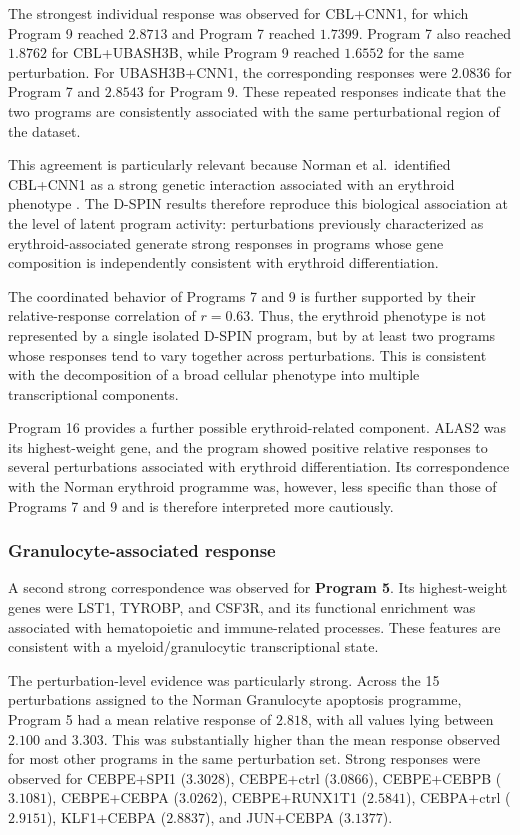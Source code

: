 \documentclass[11pt,a4paper]{article}
\begin{document}
The strongest individual response was observed for CBL+CNN1, for which Program 9 reached $2.8713$ and Program 7 reached $1.7399$. Program 7 also reached $1.8762$ for CBL+UBASH3B, while Program 9 reached $1.6552$ for the same perturbation. For UBASH3B+CNN1, the corresponding responses were $2.0836$ for Program 7 and $2.8543$ for Program 9. These repeated responses indicate that the two programs are consistently associated with the same perturbational region of the dataset.

This agreement is particularly relevant because Norman et al.~identified CBL+CNN1 as a strong genetic interaction associated with an erythroid phenotype \citep{Norman2019}. The D-SPIN results therefore reproduce this biological association at the level of latent program activity: perturbations previously characterized as erythroid-associated generate strong responses in programs whose gene composition is independently consistent with erythroid differentiation.

The coordinated behavior of Programs 7 and 9 is further supported by their relative-response correlation of $r=0.63$. Thus, the erythroid phenotype is not represented by a single isolated D-SPIN program, but by at least two programs whose responses tend to vary together across perturbations. This is consistent with the decomposition of a broad cellular phenotype into multiple transcriptional components.

Program 16 provides a further possible erythroid-related component. ALAS2 was its highest-weight gene, and the program showed positive relative responses to several perturbations associated with erythroid differentiation. Its correspondence with the Norman erythroid programme was, however, less specific than those of Programs 7 and 9 and is therefore interpreted more cautiously.

\subsubsection{Granulocyte-associated response}

A second strong correspondence was observed for \textbf{Program 5}. Its highest-weight genes were LST1, TYROBP, and CSF3R, and its functional enrichment was associated with hematopoietic and immune-related processes. These features are consistent with a myeloid/granulocytic transcriptional state.

The perturbation-level evidence was particularly strong. Across the 15 perturbations assigned to the Norman Granulocyte apoptosis programme, Program 5 had a mean relative response of $2.818$, with all values lying between $2.100$ and $3.303$. This was substantially higher than the mean response observed for most other programs in the same perturbation set. Strong responses were observed for CEBPE+SPI1 ($3.3028$), CEBPE+ctrl ($3.0866$), CEBPE+CEBPB ($3.1081$), CEBPE+CEBPA ($3.0262$), CEBPE+RUNX1T1 ($2.5841$), CEBPA+ctrl ($2.9151$), KLF1+CEBPA ($2.8837$), and JUN+CEBPA ($3.1377$).
\end{document}
